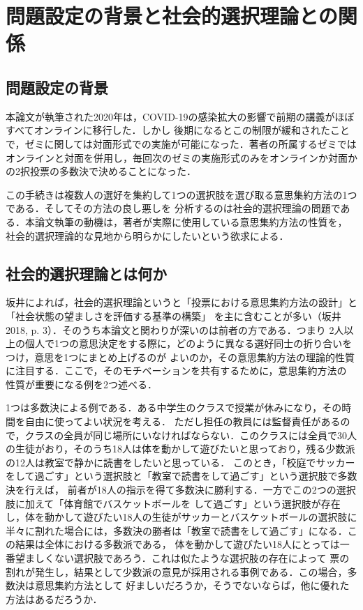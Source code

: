 \documentclass[dvipdfmx]{jsarticle}
\begin{document}
\section{問題設定の背景と社会的選択理論との関係}
\subsection{問題設定の背景}
本論文が執筆された2020年は，COVID-19の感染拡大の影響で前期の講義がほぼすべてオンラインに移行した．しかし
後期になるとこの制限が緩和されたことで，ゼミに関しては対面形式での実施が可能になった．著者の所属するゼミでは
オンラインと対面を併用し，毎回次のゼミの実施形式のみをオンラインか対面かの2択投票の多数決で決めることになった．

この手続きは複数人の選好を集約して1つの選択肢を選び取る意思集約方法の1つである．そしてその方法の良し悪しを
分析するのは社会的選択理論の問題である．本論文執筆の動機は，著者が実際に使用している意思集約方法の性質を，
社会的選択理論的な見地から明らかにしたいという欲求による．

\subsection{社会的選択理論とは何か}\label{社会的選択とは何か}
坂井によれば，社会的選択理論というと「投票における意思集約方法の設計」と「社会状態の望ましさを評価する基準の構築」
を主に含むことが多い（坂井 2018, p. 3）．そのうち本論文と関わりが深いのは前者の方である．つまり
2人以上の個人で1つの意思決定をする際に，どのように異なる選好同士の折り合いをつけ，意思を1つにまとめ上げるのが
よいのか，その意思集約方法の理論的性質に注目する．ここで，そのモチベーションを共有するために，意思集約方法の
性質が重要になる例を2つ述べる．

1つは多数決による例である．ある中学生のクラスで授業が休みになり，その時間を自由に使ってよい状況を考える．
ただし担任の教員には監督責任があるので，クラスの全員が同じ場所にいなければならない．このクラスには全員で30人
の生徒がおり，そのうち18人は体を動かして遊びたいと思っており，残る少数派の12人は教室で静かに読書をしたいと思っている．
このとき，「校庭でサッカーをして過ごす」という選択肢と「教室で読書をして過ごす」という選択肢で多数決を行えば，
前者が18人の指示を得て多数決に勝利する．一方でこの2つの選択肢に加えて「体育館でバスケットボールを
して過ごす」という選択肢が存在し，体を動かして遊びたい18人の生徒がサッカーとバスケットボールの選択肢に
半々に割れた場合には，多数決の勝者は「教室で読書をして過ごす」になる．この結果は全体における多数派である，
体を動かして遊びたい18人にとっては一番望ましくない選択肢であろう．これは似たような選択肢の存在によって
票の割れが発生し，結果として少数派の意見が採用される事例である．この場合，多数決は意思集約方法として
好ましいだろうか，そうでないならば，他に優れた方法はあるだろうか．
\end{document}
